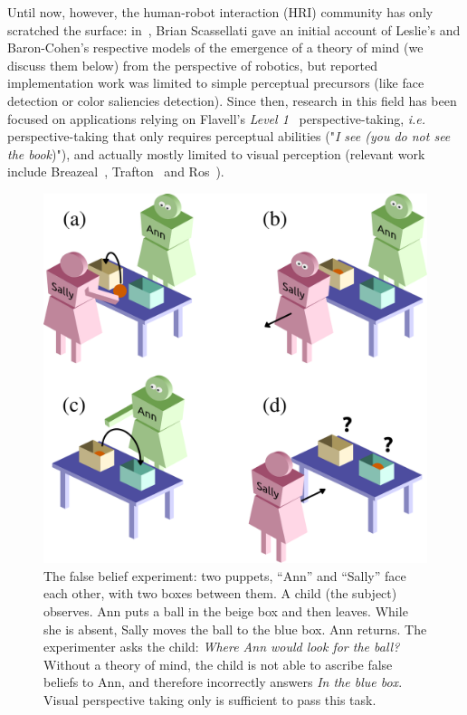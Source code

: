 \documentclass{sig-alternate}
\newcommand{\ie}{{\textit{i.e.~}}}
\begin{document}
Until now, however, the human-robot interaction (HRI) community has only
scratched the surface: in~\cite{scassellati2002theory}, Brian Scassellati gave
an initial account of Leslie's and Baron-Cohen's respective models of the
emergence of a theory of mind (we discuss them below) from the perspective of
robotics, but reported implementation work was limited to simple perceptual
precursors (like face detection or color saliencies detection). Since then,
research in this field has been focused on applications relying on Flavell's
\emph{Level 1}~\cite{flavell1977development} perspective-taking, \ie
perspective-taking that only requires perceptual abilities ("\emph{I see (you do
not see the book})"), and actually mostly limited to visual perception (relevant
work include Breazeal~\cite{Breazeal2006}, Trafton~\cite{Trafton2005} and
Ros~\cite{Ros2010}).

\begin{figure}[h!t]
        \centering
        \includegraphics[width=0.7\linewidth]{sally_ann}
        \caption{The false belief experiment: two puppets, ``Ann'' and
            ``Sally'' face each other, with two boxes between them. A child (the
            subject) observes. Ann puts a ball in the beige box and then leaves.
            While she is absent, Sally moves the ball to the blue box. Ann
            returns. The experimenter asks the child: \emph{Where Ann would look
            for the ball?} Without a theory of mind, the child is not able
            to ascribe false beliefs to Ann, and therefore incorrectly answers
            \emph{In the blue box}. Visual perspective taking only is sufficient
            to pass this task.}

        \label{false-beliefs}
\end{figure}
\end{document}
